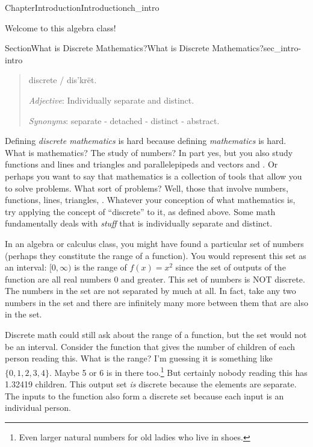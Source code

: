 \documentclass[twoside,11pt,]{book}
\numberwithin{equation}{chapter}
\begin{document}
\begin{chapterptx}{Chapter}{Introduction}{}{Introduction}{}{}{ch_intro}
\renewcommand*{\chaptername}{Chapter}
\begin{introduction}{}%
Welcome to this algebra class!%
\end{introduction}%
%
%
\typeout{************************************************}
\typeout{************************************************}
%
\begin{sectionptx}{Section}{What is Discrete Mathematics?}{}{What is Discrete Mathematics?}{}{}{sec_intro-intro}
\begin{quote}%
dis\textperiodcentered{}crete \slash{} dis'krët.%
\par
\emph{Adjective}: Individually separate and distinct.%
\par
\emph{Synonyms}: separate - detached - distinct - abstract.%
\end{quote}
Defining \emph{discrete mathematics} is hard because defining \emph{mathematics} is hard. What is mathematics? The study of numbers? In part yes, but you also study functions and lines and triangles and parallelepipeds and vectors and \textellipsis{}. Or perhaps you want to say that mathematics is a collection of tools that allow you to solve problems. What sort of problems? Well, those that involve numbers, functions, lines, triangles, \textellipsis{}. Whatever your conception of what mathematics is, try applying the concept of ``discrete'' to it, as defined above. Some math fundamentally deals with \emph{stuff} that is individually separate and distinct.%
\par
In an algebra or calculus class, you might have found a particular set of numbers (perhaps they constitute the range of a function). You would represent this set as an interval: \([0,\infty)\) is the range of \(f(x) = x^2\) since the set of outputs of the function are all real numbers 0 and greater. This set of numbers is NOT discrete. The numbers in the set are not separated by much at all. In fact, take any two numbers in the set and there are infinitely many more between them that are also in the set.%
\par
Discrete math could still ask about the range of a function, but the set would not be an interval. Consider the function that gives the number of children of each person reading this. What is the range? I'm guessing it is something like \(\{0, 1, 2, 3, 4\}\). Maybe 5 or 6 is in there too.\footnote{Even larger natural numbers for old ladies who live in shoes.\label{sec_intro-intro-5-2}} But certainly nobody reading this has 1.32419 children. This output set \emph{is} discrete because the elements are separate. The inputs to the function also form a discrete set because each input is an individual person.%

\end{sectionptx}
\end{chapterptx}
\end{document}
